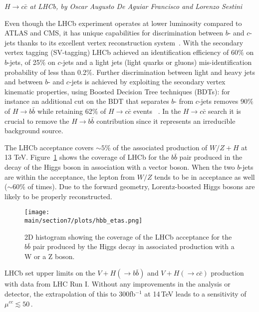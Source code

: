 \documentclass[../report.tex]{subfiles}
\providecommand{\main}{..}
\begin{document}
\begin{center}{\emph{$H \rightarrow c \bar{c}$ at LHCb, by Oscar Augusto De Aguiar Francisco and Lorenzo Sestini}} \end{center}

Even though the LHCb experiment operates at lower luminosity  compared to ATLAS and CMS, it has unique capabilities for discrimination between $b$- and $c$-jets thanks to its excellent vertex reconstruction system~\cite{Aaij:2015yqa}. With the secondary vertex tagging (SV-tagging) LHCb achieved an identification efficiency of 60$\%$ on $b$-jets, of 25$\%$ on $c$-jets and a light jets (light quarks or gluons) mis-identification probability of less than 0.2$\%$. Further discrimination between light and heavy jets and between $b$- and $c$-jets is achieved by exploiting the secondary vertex kinematic properties, using Boosted Decision Tree techniques (BDTs): for instance an additional cut on the BDT that separates $b$- from $c$-jets removes 90$\%$ of $H\rightarrow b \bar{b}$ while retaining 62$\%$ of $H\rightarrow c \bar{c}$ events  ~\cite{LHCb:2016yxg}. In the $H\rightarrow c \bar{c}$ search it is crucial to remove the $H\rightarrow b \bar{b}$ contribution since it represents an irreducible background source.

The LHCb acceptance covers $\sim 5$\% of the associated production of $W/Z+H$ at 13 TeV.  Figure~\ref{fig:hbbetas} shows the coverage of  LHCb for the $b\bar{b}$ pair produced in the decay of the  Higgs boson in association with a vector boson. When the two $b$-jets are within the acceptance, the lepton from $W/Z$ tends to be in acceptance as well ($\sim 60$\% of times). Due to the forward geometry, Lorentz-boosted Higgs bosons are  likely to be properly reconstructed.

\begin{figure}[ht]
	\centering
	\texttt{[image: \\main/section7/plots/hbb\_etas.png]}
	\caption{2D histogram showing the coverage of the LHCb acceptance for the $b\bar{b}$ pair produced by the Higgs decay in associated production with a W or a Z boson.}
	\label{fig:hbbetas}
\end{figure}

LHCb set  upper limits on the $V+H(\rightarrow b \bar{b})$ and $V+H(\rightarrow c \bar{c})$ production~\cite{LHCb:2016yxg} with data from LHC Run I.
Without any improvements in the analysis or detector, the extrapolation of this  to 300fb$^{-1}$ at 14\,TeV leads to a sensitivity of $\mu^{cc}\lesssim 50\,$. 
\end{document}
